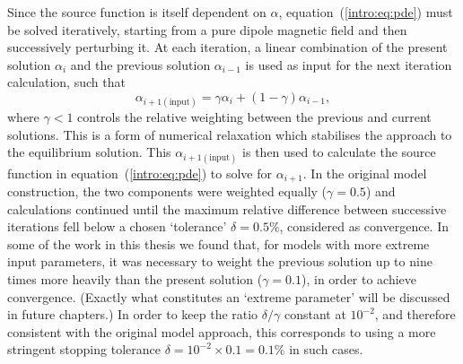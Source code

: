 Since the source function is itself dependent on $\alpha$, equation~(\ref{intro:eq:pde}) must be solved iteratively, starting from a pure dipole magnetic field and then successively perturbing it. At each iteration, a linear combination of the present solution $\alpha_i$ and the previous solution $\alpha_{i-1}$ is used as input for the next iteration calculation, such that
\begin{equation}\label{intro:eq:convergence}
\alpha_{i+1\mathrm{(input)}} = \gamma\alpha_i + (1-\gamma)\alpha_{i-1},
\end{equation}
where $\gamma<1$ controls the relative weighting between the previous and current solutions. This is a form of numerical relaxation which stabilises the approach to the equilibrium solution. This $\alpha_{i+1(\mathrm{input})}$ is then used to calculate the source function in equation~(\ref{intro:eq:pde}) to solve for $\alpha_{i+1}$. In the original model construction, the two components were weighted equally ($\gamma=0.5$) and calculations continued until the maximum relative difference between successive iterations fell below a chosen `tolerance' $\delta = 0.5\%$, considered as convergence. In some of the work in this thesis we found that, for models with more extreme input parameters, it was necessary to weight the previous solution up to nine times more heavily than the present solution ($\gamma=0.1$), in order to achieve convergence. (Exactly what constitutes an `extreme parameter' will be discussed in future chapters.) In order to keep the ratio $\delta/\gamma$ constant at $10^{-2}$, and therefore consistent with the original model approach, this corresponds to using a more stringent stopping tolerance $\delta = 10^{-2}\times0.1 = 0.1\%$ in such cases.

